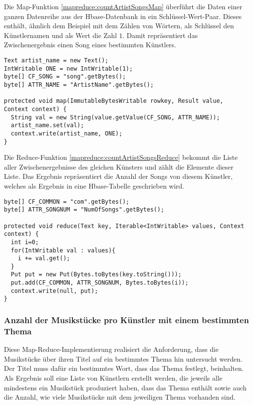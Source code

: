 Die Map-Funktion \ref{mapreduce:countArtistSongsMap} überführt die Daten einer ganzen
Datenreihe aus der Hbase-Datenbank in ein Schlüssel-Wert-Paar. Dieses enthält, ähnlich 
dem Beispiel mit dem Zählen von Wörtern, als Schlüssel den Künstlernamen und als Wert
die Zahl $1$. Damit repräsentiert das Zwischenergebnis einen Song eines bestimmten Künstlers.

\begin{lstlisting}[caption={Map-Funktion zur Anzahl der Musikstücke pro Künstler}, label=mapreduce:countArtistSongsMap]
Text artist_name = new Text();
IntWritable ONE = new IntWritable(1);
byte[] CF_SONG = "song".getBytes();
byte[] ATTR_NAME = "ArtistName".getBytes();

protected void map(ImmutableBytesWritable rowkey, Result value, Context context) {
  String val = new String(value.getValue(CF_SONG, ATTR_NAME));
  artist_name.set(val);
  context.write(artist_name, ONE);
}
\end{lstlisting}

Die Reduce-Funktion \ref{mapreduce:countArtistSongsReduce} bekommt die Liste aller
Zwischenergebnisse des gleichen Künsters und zählt die Elemente dieser Liste. Das Ergebnis
repräsentiert die Anzahl der Songs von diesem Künstler, welches als Ergebnis in eine 
Hbase-Tabelle geschrieben wird.

\begin{lstlisting}[caption={Reduce-Funktion zur Anzahl der Musikstücke pro Künstler}, label=mapreduce:countArtistSongsReduce]
byte[] CF_COMMON = "com".getBytes();
byte[] ATTR_SONGNUM = "NumOfSongs".getBytes();

protected void reduce(Text key, Iterable<IntWritable> values, Context context) {
  int i=0;
  for(IntWritable val : values){
    i += val.get();
  }          
  Put put = new Put(Bytes.toBytes(key.toString()));
  put.add(CF_COMMON, ATTR_SONGNUM, Bytes.toBytes(i));
  context.write(null, put);
}
\end{lstlisting}

\subsubsection{Anzahl der Musikstücke pro Künstler mit einem bestimmten Thema}
Diese Map-Reduce-Implementierung realisiert die Anforderung, dass die Musikstücke über
ihren Titel auf ein bestimmtes Thema hin untersucht werden. Der Titel muss dafür ein bestimmtes
Wort, dass das Thema festlegt, beinhalten. Als Ergebnis soll eine Liste von Künstlern erstellt werden,
die jeweils alle mindestens ein Musikstück produziert haben, dass das Thema enthält sowie auch
die Anzahl, wie viele Musikstücke mit dem jeweiligen Thema vorhanden sind.

